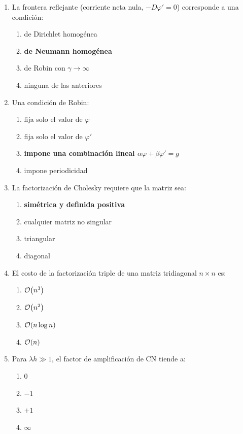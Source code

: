 \begin{enumerate}[label=\textbf{\arabic*.},leftmargin=*,itemsep=8pt]
	\item La frontera reflejante (corriente neta nula, $-D\varphi' = 0$) corresponde a una condición:
	\begin{enumerate}[label=\alph*)]
		\item de Dirichlet homogénea 
		\item {\bfseries\boldmath\color{red} de Neumann homogénea}
		\item de Robin con $\gamma\to\infty$ 
		\item ninguna de las anteriores
	\end{enumerate}
	
	\item Una condición de Robin:
	\begin{enumerate}[label=\alph*)]
		\item fija solo el valor de $\varphi$ 
		\item fija solo el valor de $\varphi'$
		\item {\bfseries\boldmath\color{red} impone una combinación lineal $\alpha\varphi + \beta\varphi' = g$} 
		\item impone periodicidad
	\end{enumerate}
	
	\item La factorización de Cholesky requiere que la matriz sea:
	\begin{enumerate}[label=\alph*)]
		\item {\bfseries\boldmath\color{red} simétrica y definida positiva} 
		\item cualquier matriz no singular
		\item triangular 
		\item diagonal
	\end{enumerate}
	
	\item El costo de la factorización triple de una matriz tridiagonal $n\times n$ es:
	\begin{enumerate}[label=\alph*)]
		\item $\mathcal{O}\!\left(n^3\right)$ 
		\item $\mathcal{O}\!\left(n^2\right)$ 
		\item $\mathcal{O}\!\left(n\log n\right)$ 
		\item {\bfseries\boldmath\color{red} $\mathcal{O}\!\left(n\right)$}
	\end{enumerate}
	
	\item Para $\lambda h \gg 1$, el factor de amplificación de CN tiende a:
	\begin{enumerate}[label=\alph*)]
		\item $0$ 
		\item {\bfseries\boldmath\color{red} $-1$} 
		\item $+1$ 
		\item $\infty$
	\end{enumerate}
	

\end{enumerate}

